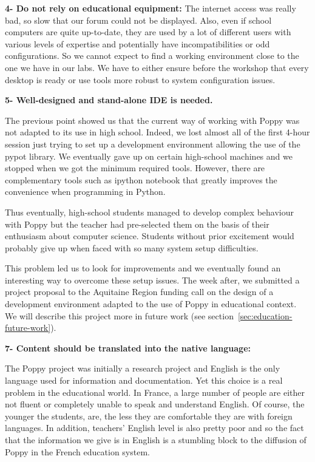 \textbf{4- Do not rely on educational equipment:}
The internet access was really bad, so slow that our forum could not be displayed. Also, even if school computers are quite up-to-date, they are used by a lot of different users with various levels of expertise and potentially have incompatibilities or odd configurations. So we cannot expect to find a working environment close to the one we have in our labs.
We have to either ensure before the workshop that every desktop is ready or use tools more robust to system configuration issues.

\textbf{5- Well-designed and stand-alone IDE is needed.}

The previous point showed us that the current way of working with Poppy was not adapted to its use in high school. Indeed, we lost almost all of the first 4-hour session just trying to set up a development environment allowing the use of the pypot library. We eventually gave up on certain high-school machines and we stopped when we got the minimum required tools. However, there are complementary tools such as ipython notebook that greatly improves the convenience when programming in Python.

Thus eventually, high-school students managed to develop complex behaviour with Poppy but the teacher had pre-selected them on the basis of their enthusiasm about computer science. Students without prior excitement would probably give up when faced with so many system setup difficulties.

This problem led us to look for improvements and we eventually found an interesting way to overcome these setup issues. The week after, we submitted a project proposal to the Aquitaine Region funding call on the design of a development environment adapted to the use of Poppy in educational context. We will describe this project more in future work (see section~\ref{sec:education-future-work}).


\textbf{7- Content should be translated into the native language:}

The Poppy project was initially a research project and English is the only language used for information and documentation. Yet this choice is a real problem in the educational world. In France, a large number of people are either not fluent or completely unable to speak and understand English. Of course, the younger the students,  are, the less they are comfortable they are with foreign languages. In addition, teachers’ English level is also pretty poor and so the fact that the information we give is in English is a stumbling block to the diffusion of Poppy in the French education system.


